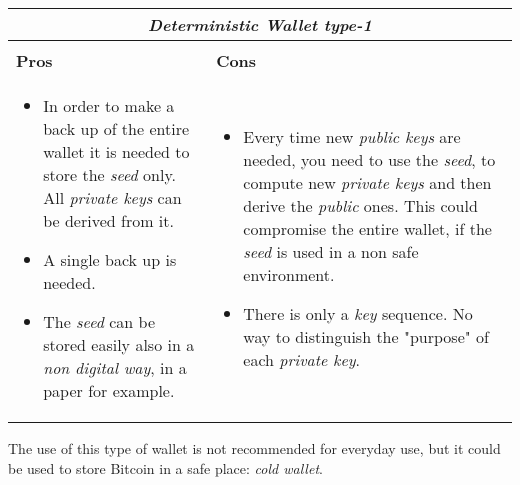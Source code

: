 \begin{center}
	\begin{tabular}{ |p{6cm}|p{6cm}|  }
		\hline
		\multicolumn{2}{|c|}{\textbf{\textit{Deterministic Wallet type-1}}} \\
		\hline \hline 
		\\
		\centerline{\textbf{Pros}}&\centerline{\textbf{Cons}}\\
		\hline
		\begin{itemize}
			\item In order to make a back up of the entire wallet it is needed to store the \textit{seed} only. All \textit{private keys} can be derived from it.
			\item A single back up is needed.
			\item The \textit{seed} can be stored easily also in a \textit{non digital way}, in a paper for example.
		\end{itemize} &
		\begin{itemize}
			\item Every time new \textit{public keys} are needed, you need to use the \textit{seed}, to compute new \textit{private keys} and then derive the \textit{public} ones. This could compromise the entire wallet, if the \textit{seed} is used in a non safe environment.
			\item There is only a \textit{key} sequence. No way to distinguish the "purpose" of each \textit{private key}.
		\end{itemize}\\
		\hline
	\end{tabular}
\end{center}
The use of this type of wallet is not recommended for everyday use, but it could be used to store Bitcoin in a safe place: \textit{cold wallet}. 

